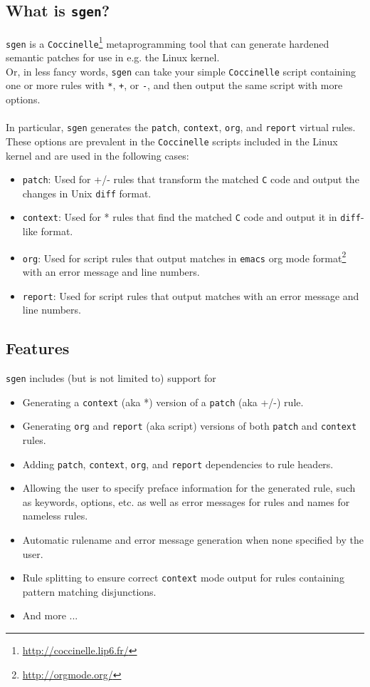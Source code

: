 \subsection{What is \texttt{sgen}?}
\texttt{sgen} is a \texttt{Coccinelle}\footnote{\hyperref[http://coccinelle.lip6.fr/]{http://coccinelle.lip6.fr/}} metaprogramming tool that can generate hardened semantic patches for use in e.g. the Linux kernel.\\
Or, in less fancy words, \texttt{sgen} can take your simple \texttt{Coccinelle} script containing one or more rules with \texttt{*}, \texttt{+}, or \texttt{-}, and then output the same script with more options.\\\\
In particular, \texttt{sgen} generates the \texttt{patch}, \texttt{context}, \texttt{org}, and \texttt{report} virtual rules. These options are prevalent in the \texttt{Coccinelle} scripts included in the Linux kernel and are used in the following cases:
\begin{itemize}
\item \texttt{patch}: Used for +/- rules that transform the matched \texttt{C} code and output the changes in Unix \texttt{diff} format.
\item \texttt{context}: Used for * rules that find the matched \texttt{C} code and output it in \texttt{diff}-like format.
\item \texttt{org}: Used for script rules that output matches in
  \texttt{emacs} org mode
  format\footnote{\hyperref[http://orgmode.org/]{http://orgmode.org/}} with
  an error message and line numbers.
\item \texttt{report}: Used for script rules that output matches with an error message and line numbers.
\end{itemize}
\bigskip

\subsection{Features}
\texttt{sgen} includes (but is not limited to) support for
\begin{itemize}
\item Generating a \texttt{context} (aka *) version of a \texttt{patch} (aka +/-) rule.
\item Generating \texttt{org} and \texttt{report} (aka script) versions of both \texttt{patch} and \texttt{context} rules.
\item Adding \texttt{patch}, \texttt{context}, \texttt{org}, and \texttt{report} dependencies to rule headers.
\item Allowing the user to specify preface information for the generated rule, such as keywords, options, etc. as well as error messages for rules and names for nameless rules.
\item Automatic rulename and error message generation when none specified by the user.
\item Rule splitting to ensure correct \texttt{context} mode output for rules containing pattern matching disjunctions.
\item And more ...
\end{itemize}
